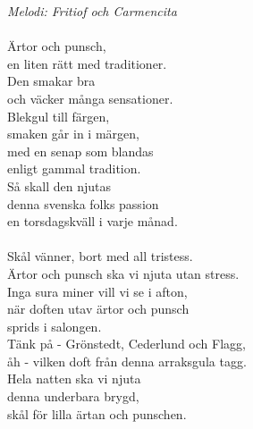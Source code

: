 {\footnotesize\textit{Melodi: Fritiof och Carmencita}}\\
\\
Ärtor och punsch,\\
en liten rätt med traditioner.\\
Den smakar bra\\
och väcker många sensationer.\\
Blekgul till färgen,\\
smaken går in i märgen,\\
med en senap som blandas\\
enligt gammal tradition.\\
Så skall den njutas\\
denna svenska folks passion\\
en torsdagskväll i varje månad.\\
\\
Skål vänner, bort med all tristess.\\
Ärtor och punsch ska vi njuta utan stress.\\
Inga sura miner vill vi se i afton,\\
när doften utav ärtor och punsch\\
sprids i salongen.\\
Tänk på - Grönstedt, Cederlund och Flagg,\\
åh - vilken doft från denna arraksgula tagg.\\
Hela natten ska vi njuta\\
denna underbara brygd,\\
skål för lilla ärtan och punschen.

